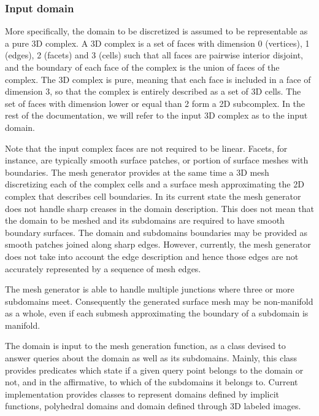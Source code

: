 \subsubsection{Input domain}

More specifically, the domain to be discretized is assumed
 to be representable as a pure
3D complex. A 3D complex is a set of faces with dimension
0 (vertices), 1 (edges), 2 (facets) and 3 (cells) such that
all faces are pairwise interior disjoint, 
and the boundary of each face of the complex is the union of faces
of the complex.
The 3D complex is pure, meaning that each face is included in a face of dimension 3,
so that the complex is entirely described as a set of 3D cells.
The set of faces with dimension lower or equal than 2 form a 2D
subcomplex. In the rest of the documentation, we will refer to the
input 3D complex as to the input domain.


Note that the input complex faces are not required to be linear. 
Facets, for instance, are typically smooth surface patches, 
or portion of surface meshes with boundaries.
The mesh generator provides at the same time
a 3D mesh discretizing each of the complex cells
and a surface mesh approximating the 2D complex 
that describes cell boundaries.
In its current state the mesh generator does not handle
sharp creases in the domain description. This does not mean  that 
the domain to be meshed  and its subdomains
are required to have smooth boundary surfaces.  The domain 
and  subdomains  boundaries  may be provided
 as smooth patches joined  along sharp edges.
However, currently, the mesh generator
 does  not take into account  the  edge description and hence
those edges are not  accurately  represented by a sequence of  mesh edges.


The mesh generator is able to handle
multiple junctions where three or more subdomains meet.
Consequently  the generated surface mesh may be non-manifold
as a whole, even if each  submesh approximating the boundary of a subdomain
is manifold.




The domain is input to the mesh generation function,
as a class 
devised to  answer queries about the domain as well as its subdomains.
Mainly, this class provides predicates which state
if  a given query point belongs 
to the domain or not, 
and in the affirmative, to which of the subdomains it belongs to.
Current implementation provides  classes to represent
domains defined by implicit functions, polyhedral domains
and domain defined through 3D labeled images.

